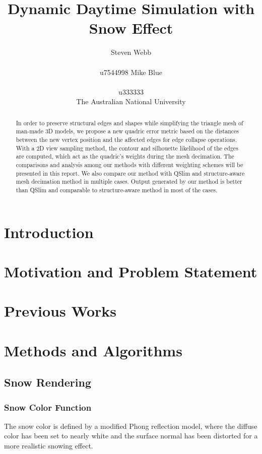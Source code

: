 \documentclass{article}
\title{Dynamic Daytime Simulation with Snow Effect}
\author{%
  Steven Webb\\\\
  u7544998 
   \And
  Mike Blue\\\\
  u333333\\
  \AND  The Australian National University 
}
\begin{document}
\maketitle


\begin{abstract}
  In order to preserve structural edges and shapes while simplifying the triangle mesh of man-made 3D models, we propose a new quadric error metric based on the distances between the new vertex position and the affected edges for edge collapse operations. With a 2D view sampling method, the contour and silhouette likelihood of the edges are computed, which act as the quadric’s weights during the mesh decimation. The comparisons and analysis among our methods with different weighting schemes will be presented in this report. We also compare our method with QSlim  and structure-aware mesh decimation method in multiple cases. Output generated by our method is better than QSlim and comparable to structure-aware method in most of the cases. 
\end{abstract}

\section{Introduction}

\section{Motivation and Problem Statement}

\section{Previous Works}

\section {Methods and Algorithms}

\subsection {Snow Rendering}

\subsubsection {Snow Color Function}
The snow color is defined by a modified Phong reflection model, where the diffuse color has been set to nearly white 
and the surface normal has been distorted for a more realistic snowing effect.
\end{document}
